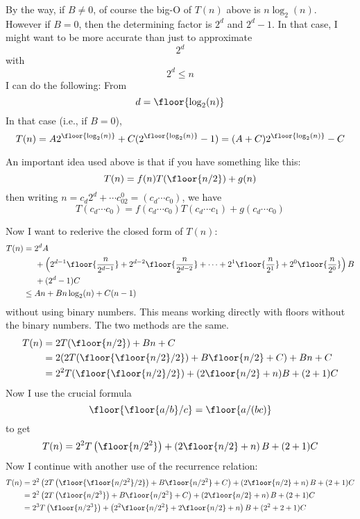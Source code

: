 By the way, if $B \neq 0$, of course the big-O of $T(n)$ 
above is $n \log_2(n)$.
However if $B = 0$, then
the determining factor is $2^d$ and $2^d - 1$.
In that case, I might want to be more accurate than just to approximate
\[
2^d
\]
with
\[
2^d \leq n
\]
I can do the following:
From
\[
d = \floor{\log_2(n)}
\]
In that case (i.e., if $B = 0$), 
\[
T(n) = A2^{\floor{\log_2(n)}} + C(2^{\floor{\log_2(n)}} - 1)
= (A + C) 2^{\floor{\log_2(n)}} - C
\]

An important idea used above is that if you have something like this:
\[
T(n) = f(n) T(\floor{n/2}) + g(n)
\]
then writing $n = c_d2^d + \cdots c_02^0 = (c_d \cdots c_0)$, we have
\[
T(c_d\cdots c_0) = f(c_d \cdots c_0) T(c_d \cdots c_1) + g(c_d \cdots c_0)
\]


Now I want to rederive the closed form
of $T(n)$:
\begin{align*}
T(n) 
&= 2^dA \\
&\hspace{0.5cm}
+ \left(
2^{d-1}\floor{ \frac{n}{2^{d-1}} } 
+ 2^{d-2}\floor{ \frac{n}{2^{d-2}} } 
+ \cdots
+ 2^1\floor{ \frac{n}{2^1} } 
+ 2^0\floor{ \frac{n}{2^0} } 
\right)B \\ 
&\hspace{0.5cm}+ (2^d - 1)C  
\\
&\leq An + Bn \log_2(n) + C(n - 1) 
\end{align*}
without using binary numbers.
This means working directly with floors without the binary numbers.
The two methods are the same.
\begin{align*}
T(n) 
&= 2T(\floor{n/2}) + Bn + C \\
&= 2(2T(\floor{\floor{n/2}/2}) + B\floor{n/2} + C) + Bn + C \\
&= 2^2 T(\floor{\floor{n/2}/2}) + (2\floor{n/2} + n)B + (2 + 1)C
\end{align*}
Now I use the crucial formula
\[
\floor{\floor{a/b}/c} = \floor{a/(bc)}
\]
to get
\[
T(n) 
= 2^2 T \left(
  \floor{n/2^2} \right) + 
  \left( 2\floor{n/2} + n \right)B + (2 + 1)C
\]
Now I continue with another use of the recurrence relation:
\begin{align*}
T(n) 
&= 2^2 \left(
         2T \left( 
              \floor{ 
                \floor{n/{2^2}} 
                / 2
              } 
           \right) 
         + 
        B \floor{n/2^2} 
         + C
       \right) 
   + \left(2 
         \floor{
          n/2
         } 
         + n\right)B 
   + (2 + 1)C \\
&= 2^2 \left(
         2T \left( 
                \floor{
                  n/2^3 
              } 
           \right) 
         + 
        B \floor{
             n/2^2
           } 
         + C
       \right) 
   + \left(2 
         \floor{
           n/2
         } 
         + n\right)B 
   + (2 + 1)C \\
&= 2^3 
      T \left( 
              \floor{
               n/2^3 
              } 
        \right)  
   + \left(
             2^2\floor{n/2^2}
             + 2 
         \floor{
          n/2
         } 
         + n
      \right)B 
   + (2^2 + 2 + 1)C \\
\end{align*}
